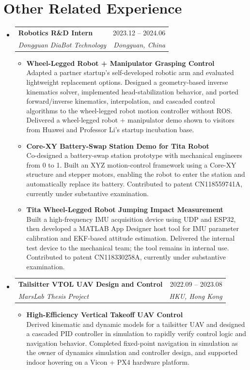 \documentclass[letterpaper,11pt]{article}
\makeatletter
\newcommand{\resumeItem}[1]{
  \item\small{
    {#1 \vspace{-2pt}}
  }
}
\newcommand{\resumeSubheading}[4]{
  \vspace{-2pt}\item
    \begin{tabular*}{0.97\textwidth}[t]{l@{\extracolsep{\fill}}r}
      \textbf{#1} & #2 \\
      \textit{\small#3} & \textit{\small #4} \\
    \end{tabular*}\vspace{-7pt}
}
\newcommand{\resumeSubHeadingListStart}{\begin{itemize}[leftmargin=0.15in, label={}]}
\newcommand{\resumeSubHeadingListEnd}{\end{itemize}}
\newcommand{\resumeItemListStart}{\begin{itemize}}
\newcommand{\resumeItemListEnd}{\end{itemize}\vspace{-5pt}}
\makeatother
\begin{document}
\section{Other Related Experience}
  \resumeSubHeadingListStart
    \resumeSubheading
      {Robotics R\&D Intern}{2023.12 -- 2024.06}
      {Dongguan DiaBot Technology}{Dongguan, China}
      \resumeItemListStart
        \resumeItem{\normalsize{\textbf{Wheel-Legged Robot + Manipulator Grasping Control}} \\
        \small{Adapted a partner startup's self-developed robotic arm and evaluated lightweight replacement options. Designed a geometry-based inverse kinematics solver, implemented head-stabilization behavior, and ported forward/inverse kinematics, interpolation, and cascaded control algorithms to the wheel-legged robot motion controller without ROS. Delivered a wheel-legged robot + manipulator demo shown to visitors from Huawei and Professor Li's startup incubation base.}}
        \resumeItem{\normalsize{\textbf{Core-XY Battery-Swap Station Demo for Tita Robot}} \\
        \small{Co-designed a battery-swap station prototype with mechanical engineers from 0 to 1. Built an XYZ motion-control framework using a Core-XY structure and stepper motors, enabling the robot to enter the station and automatically replace its battery. Contributed to patent CN118559741A, currently under substantive examination.}}
        \resumeItem{\normalsize{\textbf{Tita Wheel-Legged Robot Jumping Impact Measurement}} \\
        \small{Built a high-frequency IMU acquisition device using UDP and ESP32, then developed a MATLAB App Designer host tool for IMU parameter calibration and EKF-based attitude estimation. Delivered the internal test device to the mechanical team; the tool remains in internal use. Contributed to patent CN118330258A, currently under substantive examination.}}
      \resumeItemListEnd

    \resumeSubheading
      {Tailsitter VTOL UAV Design and Control}{2022.09 -- 2023.08}
      {MarsLab Thesis Project}{HKU, Hong Kong}
      \resumeItemListStart
        \resumeItem{\normalsize{\textbf{High-Efficiency Vertical Takeoff UAV Control}} \\
        \small{Derived kinematic and dynamic models for a tailsitter UAV and designed a cascaded PID controller in simulation to rapidly verify control logic and navigation behavior. Completed fixed-point navigation in simulation as the owner of dynamics simulation and controller design, and supported indoor hovering on a Vicon + PX4 hardware platform.}}
      \resumeItemListEnd
  \resumeSubHeadingListEnd
\end{document}
